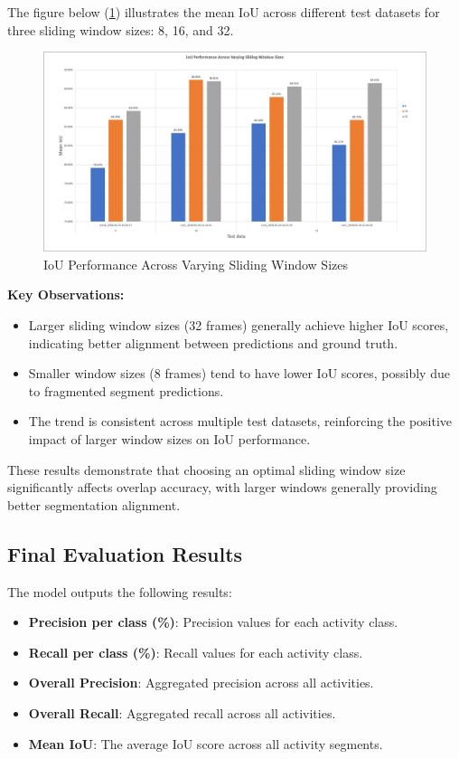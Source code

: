 \documentclass{article}
\begin{document}
The figure below (\ref{fig:iou-performance}) illustrates the mean IoU across different test datasets for three sliding window sizes: 8, 16, and 32.

\begin{figure}[h]
    \centering
    \includegraphics[width=0.8\linewidth]{Latex Files/figs/iou.png}
    \caption{IoU Performance Across Varying Sliding Window Sizes}
    \label{fig:iou-performance}
\end{figure}

\textbf{Key Observations:}
\begin{itemize}
    \item Larger sliding window sizes (32 frames) generally achieve higher IoU scores, indicating better alignment between predictions and ground truth.
    \item Smaller window sizes (8 frames) tend to have lower IoU scores, possibly due to fragmented segment predictions.
    \item The trend is consistent across multiple test datasets, reinforcing the positive impact of larger window sizes on IoU performance.
\end{itemize}

These results demonstrate that choosing an optimal sliding window size significantly affects overlap accuracy, with larger windows generally providing better segmentation alignment.

\newpage
\subsection{Final Evaluation Results}

The model outputs the following results:

\begin{itemize}
    \item \textbf{Precision per class (\%)}: Precision values for each activity class.
    \item \textbf{Recall per class (\%)}: Recall values for each activity class.
    \item \textbf{Overall Precision}: Aggregated precision across all activities.
    \item \textbf{Overall Recall}: Aggregated recall across all activities.
    \item \textbf{Mean IoU}: The average IoU score across all activity segments.
\end{itemize}
\end{document}
